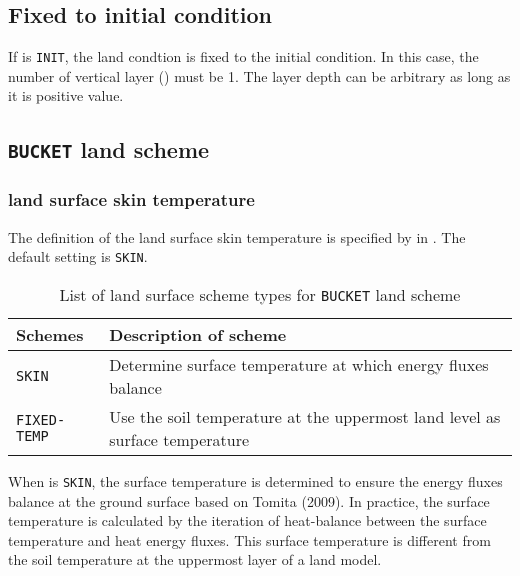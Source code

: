 \subsection{Fixed to initial condition}

If  is \verb|INIT|, the land condtion is fixed to the initial condition.
In this case, the number of vertical layer () must be 1.
The layer depth can be arbitrary as long as it is positive value.



\subsection{\texttt{BUCKET} land scheme}

\subsubsection{land surface skin temperature}

The definition of the land surface skin temperature is specified by  in .
The default setting is \verb|SKIN|.
%
\begin{table}[hbt]
\begin{center}
  \caption{List of land surface scheme types for \texttt{BUCKET} land scheme}
  \label{tab:nml_land_sfc}
  \begin{tabularx}{150mm}{lX} \hline
    \rowcolor[gray]{0.9}  Schemes & Description of scheme \\ \hline
      \verb|SKIN|       & Determine surface temperature at which energy fluxes balance \\
      \verb|FIXED-TEMP| & Use the soil temperature at the uppermost land level as surface temperature \\
    \hline
  \end{tabularx}
\end{center}
\end{table}

When  is \verb|SKIN|,
the surface temperature is determined to ensure the energy fluxes balance at the ground surface based on Tomita (2009).
In practice, the surface temperature is calculated by the iteration of heat-balance
between the surface temperature and heat energy fluxes.
This surface temperature is different from the soil temperature at the uppermost layer of a land model.

